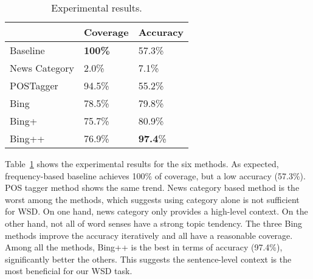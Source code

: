\begin{CJK}{UTF8}{gbsn}
\begin{table}[ht]
\centering
  \caption{Experimental results.}
  \label{table:evaluation_1}
  \begin{tabular}{| p{2.5cm} | p{1.8cm} | p{1.8cm} |}
    \hline
     & Coverage & Accuracy\\
    \hline
    Baseline & {\bf 100\%} & 57.3\%\\
    \hline
    News Category & 2.0\% & 7.1\%\\
    \hline
    POSTagger & 94.5\% & 55.2\%\\
        \hline
    Bing & 78.5\% & 79.8\%\\
    \hline
    Bing+ & 75.7\% & 80.9\%\\
    \hline
    Bing++ & 76.9\% & {\bf 97.4}\%\\
    \hline
  \end{tabular}
\end{table}

Table~\ref{table:evaluation_1} shows the experimental results for the six methods.
As expected, frequency-based baseline achieves 100\% of coverage, but a low accuracy (57.3\%). POS tagger method shows the same trend. News category based method is the worst among the methods, which suggests using category alone is not sufficient for WSD. On one hand, news category only provides a high-level context. On the other hand, not all of word senses have a strong topic tendency. 
The three Bing methods improve the accuracy iteratively and all have a reasonable coverage. Among all the methods, Bing++ is the best in terms of accuracy (97.4\%), significantly better the others. This suggests the sentence-level context is the most beneficial for our WSD task. 





\end{CJK}
